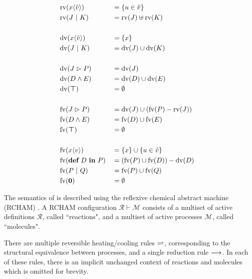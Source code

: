 \begin{alignat*}{2}
  & \operatorname{rv}(x\langle\tilde{v}\rangle) & &= \{ u \in \tilde{v} \} \\
  & \operatorname{rv}(J \ |\  K)           & &= \operatorname{rv}(J) \uplus \operatorname{rv}(K) \\
  \\
  & \operatorname{dv}(x\langle\tilde{v}\rangle) & &= \{ x \} \\
  & \operatorname{dv}(J \ |\  K)           & &= \operatorname{dv}(J) \cup \operatorname{dv}(K) \\
  \\
  & \operatorname{dv}(J \vartriangleright P)         & &= \operatorname{dv}(J) \\
  & \operatorname{dv}(D \wedge E)           & &= \operatorname{dv}(D) \cup \operatorname{dv}(E) \\
  & \operatorname{dv}(\boldsymbol{\top})           & &= \emptyset \\
  \\
  & \operatorname{fv}(J \vartriangleright P)         & &= \operatorname{dv}(J) \cup (\operatorname{fv}(P) - \operatorname{rv}(J)) \\
  & \operatorname{fv}(D \wedge E)           & &= \operatorname{fv}(D) \cup \operatorname{fv}(E) \\
  & \operatorname{fv}(\boldsymbol{\top})           & &= \emptyset \\
  \\
  & \operatorname{fv}(x\langle v\rangle)         & &= \{ x \} \cup \{ u \in \tilde{v} \} \\
  & \operatorname{fv}(\textbf{def} \ D \ \textbf{in} \ P)         & &= (\operatorname{fv}(P) \cup \operatorname{fv}(D)) - \operatorname{dv}(D) \\
  & \operatorname{fv}(P \ |\  Q)           & &= \operatorname{fv}(P) \cup \operatorname{fv}(Q) \\
  & \operatorname{fv}(\textbf{0})          & &= \emptyset \\
\end{alignat*}



The semantics of \joincalc is described using the reflexive chemical abstract
machine (RCHAM) \cite{fournet_reflexive_1996}.
A RCHAM configuration
$ \mathcal{R} \vdash \mathcal{M} $
consists of a multiset of active definitions $\mathcal{R}$,
called ``reactions",
and a multiset of active processes $\mathcal{M}$,
called ``molecules".

There are multiple reversible heating/cooling rules $\rightleftharpoons$,
corresponding to the structural equivalence between processes,
and a single reduction rule $\longrightarrow$.
In each of these rules, there is an implicit unchanged context of reactions and
molecules which is omitted for brevity.

